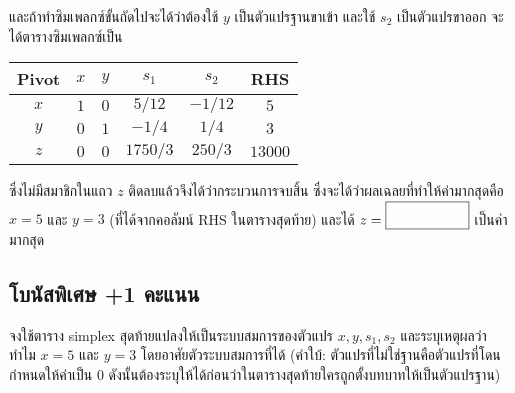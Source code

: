 \begin{multicols}{2}
    และถ้าทำซิมเพลกซ์ขั้นถัดไปจะได้ว่าต้องใช้ $y$ เป็นตัวแปรฐานขาเข้า และใช้ $s_2$ เป็นตัวแปรขาออก จะได้ตารางซิมเพลกซ์เป็น

    \begin{tabular}{|c|cccc|c|}
        \hline
        \textbf{Pivot} & $x$ & $y$ &  $s_1$ & $s_2$ &  \textbf{RHS}  \\
        \hline
        $x$ & $1$ & $0$  & $5/12$ & $-1/12$ & $5$ \\
        $y$ & $0$ & $1$  & $-1/4$ & $1/4$ & $3$ \\
        \hline
        $z$   & $0$ & $0$  & $1750/3$ & $250/3$ & $13000$ \\
        \hline
    \end{tabular}
\end{multicols}

ซึ่งไม่มีสมาชิกในแถว $z$ ติดลบแล้วจึงได้ว่ากระบวนการจบสิ้น ซึ่งจะได้ว่าผลเฉลยที่ทำให้ค่ามากสุดคือ $x = 5$ และ $y=3$ (ที่ได้จากคอลัมน์ RHS ในตารางสุดท้าย) และได้ $z = \blank[]{1.5cm}$ เป็นค่ามากสุด

\subsection*{โบนัสพิเศษ +1 คะแนน}
จงใช้ตาราง simplex สุดท้ายแปลงให้เป็นระบบสมการของตัวแปร $x, y, s_1, s_2$ และระบุเหตุผลว่าทำไม $x = 5$ และ $y=3$ โดยอาศัยตัวระบบสมการที่ได้ (คำใบ้: ตัวแปรที่ไม่ใช่ฐานคือตัวแปรที่โดนกำหนดให้ค่าเป็น 0 ดังนั้นต้องระบุให้ได้ก่อนว่าในตารางสุดท้ายใครถูกตั้งบทบาทให้เป็นตัวแปรฐาน)

